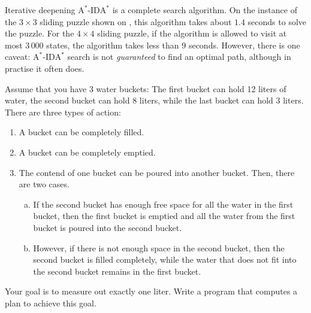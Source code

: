 Iterative deepening $\mathrm{A}^*$-$\mathrm{IDA}^*$ is a complete search algorithm. 
On the instance of the $3 \times 3$ sliding puzzle shown on , this
algorithm takes about $1.4$ seconds to solve the puzzle.  For the $4 \times 4$ sliding puzzle, if the algorithm
is allowed to visit at most $3\,000$ states, the algorithm takes less than $9$ seconds.  However, there is one
caveat: $\mathrm{A}^*$-$\mathrm{IDA}^*$ search is not \emph{guaranteed} to find an optimal path, although in practise it often does. 

\exercise
Assume that you have 3 water buckets:  The first bucket can hold 12 liters of water, the second bucket can hold 8 liters,
while the last bucket can hold 3 liters.  There are three types of action:
\begin{enumerate}
\item A bucket can be completely filled.
\item A bucket can be completely emptied.
\item The contend of one bucket can be poured into another bucket.  Then, there are two cases.
      \begin{enumerate}[(a)]
      \item If the second bucket has enough free space for all the water in the first bucket, 
            then the first bucket is emptied and all the water from the first bucket is poured 
            into the second bucket.  
      \item However, if there is not enough space in the second bucket, then the second bucket is filled
            completely, while the water that does not fit into the second bucket remains in the first bucket.  
      \end{enumerate}
\end{enumerate}
Your goal is to measure out exactly one liter.  Write a program that computes a plan to achieve this goal.
\eox


